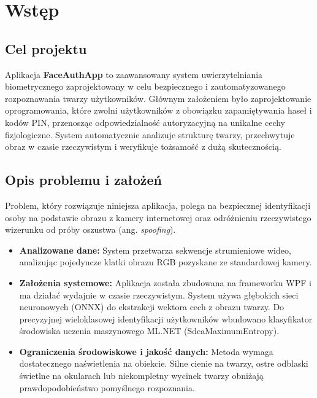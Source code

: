 \chapter{Wstęp}

\section{Cel projektu}
Aplikacja \textbf{FaceAuthApp} to zaawansowany system uwierzytelniania biometrycznego zaprojektowany w celu bezpiecznego i zautomatyzowanego rozpoznawania twarzy użytkowników. Głównym założeniem było zaprojektowanie oprogramowania, które zwolni użytkowników z obowiązku zapamiętywania haseł i kodów PIN, przenosząc odpowiedzialność autoryzacyjną na unikalne cechy fizjologiczne. System automatycznie analizuje strukturę twarzy, przechwytuje obraz w czasie rzeczywistym i weryfikuje tożsamość z dużą skutecznością.

\section{Opis problemu i założeń}
Problem, który rozwiązuje niniejsza aplikacja, polega na bezpiecznej identyfikacji osoby na podstawie obrazu z kamery internetowej oraz odróżnieniu rzeczywistego wizerunku od próby oszustwa (ang. \textit{spoofing}).
\begin{itemize}
    \item \textbf{Analizowane dane:} System przetwarza sekwencje strumieniowe wideo, analizując pojedyncze klatki obrazu RGB pozyskane ze standardowej kamery.
    \item \textbf{Założenia systemowe:} Aplikacja została zbudowana na frameworku WPF i ma działać wydajnie w czasie rzeczywistym. System używa głębokich sieci neuronowych (ONNX) do ekstrakcji wektora cech z obrazu twarzy. Do precyzyjnej wieloklasowej identyfikacji użytkowników wbudowano klasyfikator środowiska uczenia maszynowego ML.NET (SdcaMaximumEntropy).
    \item \textbf{Ograniczenia środowiskowe i jakość danych:} Metoda wymaga dostatecznego naświetlenia na obiekcie. Silne cienie na twarzy, ostre odblaski świetlne na okularach lub niekompletny wycinek twarzy obniżają prawdopodobieństwo pomyślnego rozpoznania.
\end{itemize}

